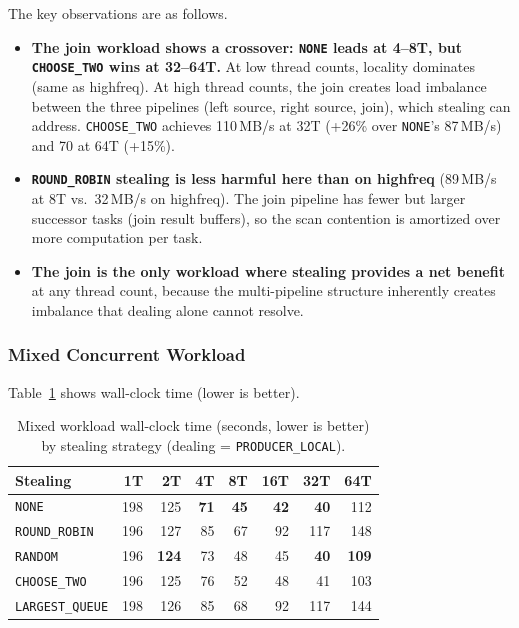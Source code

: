 The key observations are as follows.
%
\begin{itemize}
    \item \textbf{The join workload shows a crossover: \texttt{NONE} leads at 4--8T, but \texttt{CHOOSE\_TWO} wins at 32--64T.}
    At low thread counts, locality dominates (same as highfreq). At high thread counts, the join creates load imbalance between the three pipelines (left source, right source, join), which stealing can address.
    \texttt{CHOOSE\_TWO} achieves 110\,MB/s at 32T (+26\% over \texttt{NONE}'s 87\,MB/s) and 70 at 64T (+15\%).

    \item \textbf{\texttt{ROUND\_ROBIN} stealing is less harmful here than on highfreq} (89\,MB/s at 8T vs.\ 32\,MB/s on highfreq).
    The join pipeline has fewer but larger successor tasks (join result buffers), so the scan contention is amortized over more computation per task.

    \item \textbf{The join is the only workload where stealing provides a net benefit} at any thread count, because the multi-pipeline structure inherently creates imbalance that dealing alone cannot resolve.
\end{itemize}

\subsubsection{Mixed Concurrent Workload}

Table~\ref{tab:ws-mixed} shows wall-clock time (lower is better).

\begin{table}[h]
\centering
\caption{Mixed workload wall-clock time (seconds, lower is better) by stealing strategy (dealing = \texttt{PRODUCER\_LOCAL}).}
\label{tab:ws-mixed}
\begin{tabular}{l|rrrrrrr}
\hline
\textbf{Stealing} & \textbf{1T} & \textbf{2T} & \textbf{4T} & \textbf{8T} & \textbf{16T} & \textbf{32T} & \textbf{64T} \\
\hline
\texttt{NONE}          & 198 & 125 & \textbf{71} & \textbf{45} & \textbf{42} & \textbf{40} & 112 \\
\texttt{ROUND\_ROBIN}  & 196 & 127 & 85 & 67 & 92 & 117 & 148 \\
\texttt{RANDOM}        & 196 & \textbf{124} & 73 & 48 & 45 & \textbf{40} & \textbf{109} \\
\texttt{CHOOSE\_TWO}   & 196 & 125 & 76 & 52 & 48 & 41 & 103 \\
\texttt{LARGEST\_QUEUE}& 198 & 126 & 85 & 68 & 92 & 117 & 144 \\
\hline
\end{tabular}
\end{table}


